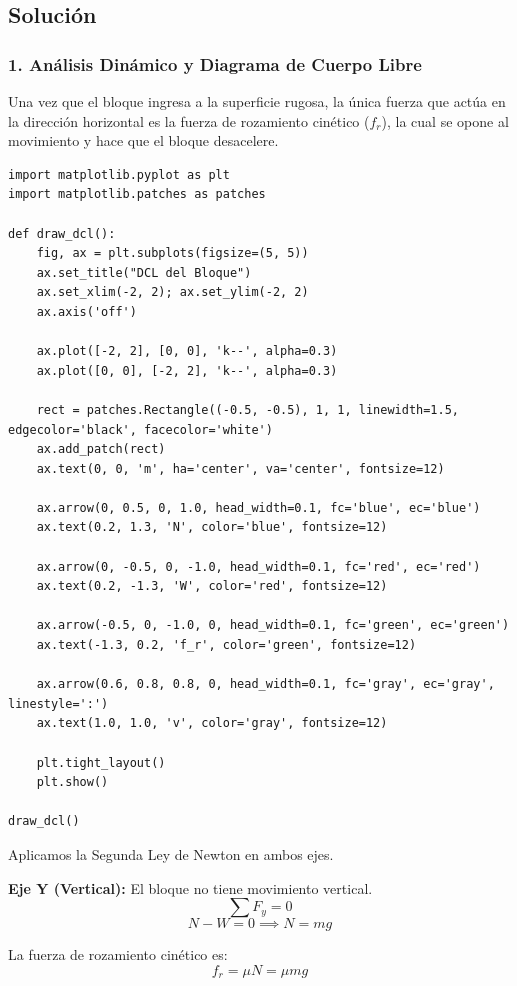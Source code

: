 \documentclass[12pt, a4paper]{article}
\begin{document}
\subsection*{Solución}

\subsubsection*{1. Análisis Dinámico y Diagrama de Cuerpo Libre}
Una vez que el bloque ingresa a la superficie rugosa, la única fuerza que actúa en la dirección horizontal es la fuerza de rozamiento cinético ($f_r$), la cual se opone al movimiento y hace que el bloque desacelere.

\begin{lstlisting}
import matplotlib.pyplot as plt
import matplotlib.patches as patches

def draw_dcl():
    fig, ax = plt.subplots(figsize=(5, 5))
    ax.set_title("DCL del Bloque")
    ax.set_xlim(-2, 2); ax.set_ylim(-2, 2)
    ax.axis('off')
    
    ax.plot([-2, 2], [0, 0], 'k--', alpha=0.3)
    ax.plot([0, 0], [-2, 2], 'k--', alpha=0.3)
    
    rect = patches.Rectangle((-0.5, -0.5), 1, 1, linewidth=1.5, edgecolor='black', facecolor='white')
    ax.add_patch(rect)
    ax.text(0, 0, 'm', ha='center', va='center', fontsize=12)
    
    ax.arrow(0, 0.5, 0, 1.0, head_width=0.1, fc='blue', ec='blue')
    ax.text(0.2, 1.3, 'N', color='blue', fontsize=12)
    
    ax.arrow(0, -0.5, 0, -1.0, head_width=0.1, fc='red', ec='red')
    ax.text(0.2, -1.3, 'W', color='red', fontsize=12)
    
    ax.arrow(-0.5, 0, -1.0, 0, head_width=0.1, fc='green', ec='green')
    ax.text(-1.3, 0.2, 'f_r', color='green', fontsize=12)
    
    ax.arrow(0.6, 0.8, 0.8, 0, head_width=0.1, fc='gray', ec='gray', linestyle=':')
    ax.text(1.0, 1.0, 'v', color='gray', fontsize=12)

    plt.tight_layout()
    plt.show()

draw_dcl()
\end{lstlisting}

Aplicamos la Segunda Ley de Newton en ambos ejes.

\textbf{Eje Y (Vertical):}
El bloque no tiene movimiento vertical.
$$ \sum F_y = 0 $$
$$ N - W = 0 \implies N = m g $$

La fuerza de rozamiento cinético es:
$$ f_r = \mu N = \mu m g $$
\end{document}
